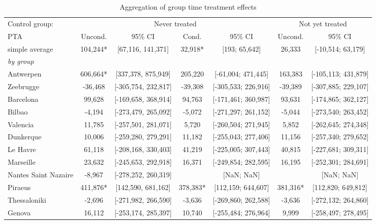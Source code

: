 \begin{table}[ht]
\centering
\caption{Aggregation of group time treatment effects} 
\begingroup\begin{adjustbox}{max width=\textwidth}
\begin{tabular}{lcccccc}
  \hline
\hline
Control group: & \multicolumn{4}{c}{Never treated} & \multicolumn{2}{c}{Not yet treated} \\
 \cmidrule(lr){2-5} \cmidrule(lr){6-7}  PTA & Uncond. & 95\% CI & Cond. & 95\% CI & Uncond. & 95\% CI  \\ 
  \hline
simple average & 104,244* & [67,116, 141,371] &   32,918* & [193; 65,642] &   26,333 & [-10,514; 63,179] \\ 
   [1ex]\emph{by group} &  &  &  &  &  &  \\ 
   \hline
Antwerpen & 606,664* & [337,378, 875,949] &  205,220 & [-61,004; 471,445] &  163,383 & [-105,113; 431,879] \\ 
  Zeebrugge & -36,468 & [-305,754, 232,817] &  -39,308 & [-305,533; 226,916] &  -39,389 & [-307,885; 229,107] \\ 
  Barcelona &  99,628 & [-169,658, 368,914] &   94,763 & [-171,461; 360,987] &   93,631 & [-174,865; 362,127] \\ 
  Bilbao &  -4,194 & [-273,479, 265,092] &   -5,072 & [-271,297; 261,152] &   -5,044 & [-273,540; 263,452] \\ 
  Valencia &  11,785 & [-257,501, 281,071] &    5,720 & [-260,504; 271,945] &    5,852 & [-262,645; 274,348] \\ 
  Dunkerque &  10,006 & [-259,280, 279,291] &   11,182 & [-255,043; 277,406] &   11,156 & [-257,340; 279,652] \\ 
  Le Havre &  61,118 & [-208,168, 330,403] &   41,219 & [-225,005; 307,443] &   40,815 & [-227,681; 309,311] \\ 
  Marseille &  23,632 & [-245,653, 292,918] &   16,371 & [-249,854; 282,595] &   16,195 & [-252,301; 284,691] \\ 
  Nantes Saint Nazaire &  -8,967 & [-278,252, 260,319] &  & [NaN; NaN] &  & [NaN; NaN] \\ 
  Piraeus & 411,876* & [142,590, 681,162] &  378,383* & [112,159; 644,607] &  381,316* & [112,820; 649,812] \\ 
  Thessaloniki &  -2,696 & [-271,982, 266,590] &   -3,636 & [-269,860; 262,588] &   -3,636 & [-272,132; 264,860] \\ 
  Genova &  16,112 & [-253,174, 285,397] &   10,740 & [-255,484; 276,964] &    9,999 & [-258,497; 278,495] \\ 

\end{tabular}
\end{adjustbox}
\end{table}
